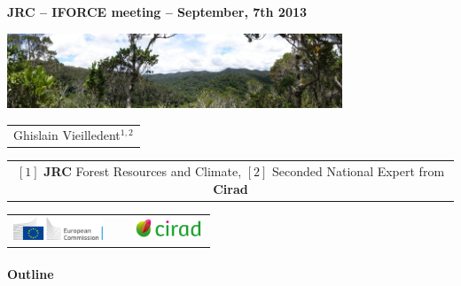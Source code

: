 {

  \begin{frame}[plain]
    \begin{center}
      \small{\textbf{JRC -- IFORCE meeting -- September, 7th 2013}}
    \end{center}
    \vspace{-0.5cm}
    \titlepage %
    \vspace{-2.5cm}
    \begin{center}
      \includegraphics[width=10cm]{figs/Banniere.png}
    \end{center}
    \begin{center}

      {\footnotesize
        \begin{tabular}{c}
          Ghislain Vieilledent$^{1,2}$
        \end{tabular}
      }

      \vspace{0.25cm}

      {\scriptsize
        \begin{tabular}{c}
          $[1]$ \textbf{JRC} Forest Resources and Climate,
          $[2]$ Seconded National Expert from \textbf{Cirad}
        \end{tabular}
      }

      \vspace{0.25cm}

      \begin{tabular}{C{2cm}C{1cm}C{2cm}}
        \includegraphics[height=0.7cm]{figs/Logo-JRC.jpg} &
        ~ &
        \includegraphics[height=0.7cm]{figs/Logo-Cirad.png}\\
      \end{tabular}

    \end{center}
    
  \end{frame}
}


\placelogotrue
\begin{frame}
  \framesubtitle{Outline}
  \begin{columns}[c]
    \begin{column}{0.5\textwidth}
      \tableofcontents[sections={1-2}]
    \end{column}
    \begin{column}{0.5\textwidth}
      \tableofcontents[sections={3-4}]
    \end{column}
  \end{columns}
\end{frame}
\placelogofalse